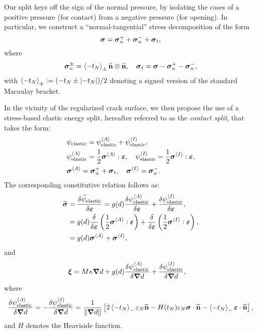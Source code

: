 Our split keys off the sign of the normal pressure, by isolating the cases of a positive pressure (for contact) from a negative pressure (for opening).  In particular, we construct a ``normal-tangential'' stress decomposition of the form
\begin{equation}
  \boldsymbol{\sigma}  = \boldsymbol{\sigma}_n^{+} + \boldsymbol{\sigma}_n^{-}  + \boldsymbol{\sigma}_t ,
\end{equation}
where
\begin{equation}
  \boldsymbol{\sigma}_n^\pm = \left<-t_N\right>_\pm\widetilde{\textbf{n}}\otimes\widetilde{\textbf{n}}, \quad  \boldsymbol{\sigma}_t = \boldsymbol{\sigma} - \boldsymbol{\sigma}_n^+ - \boldsymbol{\sigma}_n^-,
\end{equation}
with $\left<-t_N\right>_\pm := (-t_N \pm \left\vert{-t_N}\right\vert)/2$ denoting a signed version of the standard Macaulay bracket.

In the vicinity of the regularized crack surface, we then propose the use of a stress-based elastic energy split, hereafter referred to as the \textit{contact split},
that takes the form:
\begin{subequations}
  \begin{align}
     & \psi_{\text{elastic}} = \psi_{\text{elastic}}^{\left< A \right>} + \psi_{\text{elastic}}^{\left< I \right>} , \label{eq: odd begin}                                                          \\
     & \psi_{\text{elastic}}^{\left< A \right>} = \dfrac{1}{2}\boldsymbol{\sigma}^{\left< A \right>}:\boldsymbol{\varepsilon}, \quad \psi_{\text{elastic}}^{\left< I \right>} = \dfrac{1}{2}\boldsymbol{\sigma}^{\left< I \right>}:\boldsymbol{\varepsilon} , \\
     & \boldsymbol{\sigma}^{\left< A \right>} = \boldsymbol{\sigma}_n^+ + \boldsymbol{\sigma}_t, \quad \boldsymbol{\sigma}^{\left< I \right>} = \boldsymbol{\sigma}_n^-.
  \end{align}
\end{subequations}
The corresponding constitutive relation follows as:
\begin{subequations}
  \begin{align}
    \widetilde{\boldsymbol{\sigma}} & = \dfrac{\delta\widetilde{\psi}_{\text{elastic}}}{\delta\boldsymbol{\varepsilon}} = g(d)\dfrac{\delta\psi_{\text{elastic}}^{\left< A \right>}}{\delta\boldsymbol{\varepsilon}} + \dfrac{\delta\psi_{\text{elastic}}^{\left< I \right>}}{\delta\boldsymbol{\varepsilon}} ,  \\
                        & = g(d)\dfrac{\delta}{\delta\boldsymbol{\varepsilon}}\left( \dfrac{1}{2}\boldsymbol{\sigma}^{\left< A \right>}:\boldsymbol{\varepsilon} \right) + \dfrac{\delta}{\delta\boldsymbol{\varepsilon}}\left( \dfrac{1}{2}\boldsymbol{\sigma}^{\left< I \right>}:\boldsymbol{\varepsilon} \right) , \\
                        & = g(d)\boldsymbol{\sigma}^{\left< A \right>} + \boldsymbol{\sigma}^{\left< I \right>} , \label{eq: odd end}
  \end{align}
\end{subequations}
and
\begin{align}
  \boldsymbol{\xi} & = M \kappa \boldsymbol{\nabla} d + g(d) \dfrac{\delta \psi_{\text{elastic}}^{\left< A \right>}}{\delta \boldsymbol{\nabla} d} + \dfrac{\delta \psi_{\text{elastic}}^{\left< I \right>}}{\delta \boldsymbol{\nabla} d} ,
\end{align}
where
\begin{align}
  \dfrac{\delta \psi_{\text{elastic}}^{\left< A \right>}}{\delta \boldsymbol{\nabla} d} = -\dfrac{\delta \psi_{\text{elastic}}^{\left< I \right>}}{\delta \boldsymbol{\nabla} d} = \dfrac{1}{\left\lVert\boldsymbol{\nabla} d\right\rVert} \left[ 2 \left<-t_N\right>_- \varepsilon_N \widetilde{\textbf{n}} - H(t_N) \varepsilon_N \boldsymbol{\sigma} \cdot \widetilde{\textbf{n}} - \left<-t_N\right>_- \boldsymbol{\varepsilon} \cdot \widetilde{\textbf{n}} \right],
\end{align}
and $H$ denotes the Heaviside function.

